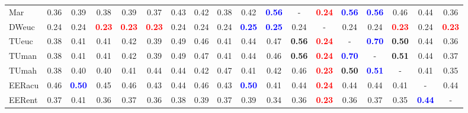 \begin{table}[h]
\begin{center}
{\begin{tabular}{lcc|cc|cc|cc|cc|cc|cc|cc|c}
Mar	&   0.36 &   0.39 &   0.38 &   0.39 &   0.37 &   0.43 &   0.42 &   0.38 &   0.42 & \textcolor{blue}{\textbf{  0.56}} & - & \textcolor{red}{\textbf{  0.24}} & \textcolor{blue}{\textbf{  0.56}} & \textcolor{blue}{\textbf{  0.56}} &   0.46 &   0.44 &   0.36 \\
DWeuc	&   0.24 &   0.24 & \textcolor{red}{\textbf{  0.23}} & \textcolor{red}{\textbf{  0.23}} & \textcolor{red}{\textbf{  0.23}} &   0.24 &   0.24 &   0.24 & \textcolor{blue}{\textbf{  0.25}} & \textcolor{blue}{\textbf{  0.25}} &   0.24 & - &   0.24 &   0.24 & \textcolor{red}{\textbf{  0.23}} &   0.24 & \textcolor{red}{\textbf{  0.23}} \\ \hline
TUeuc	&   0.38 &   0.41 &   0.41 &   0.42 &   0.39 &   0.49 &   0.46 &   0.41 &   0.44 &   0.47 & \textbf{  0.56} & \textcolor{red}{\textbf{  0.24}} & - & \textcolor{blue}{\textbf{  0.70}} & \textbf{  0.50} &   0.44 &   0.36 \\
TUman	&   0.38 &   0.41 &   0.41 &   0.42 &   0.39 &   0.49 &   0.47 &   0.41 &   0.44 &   0.46 & \textbf{  0.56} & \textcolor{red}{\textbf{  0.24}} & \textcolor{blue}{\textbf{  0.70}} & - & \textbf{  0.51} &   0.44 &   0.37 \\ \hline
TUmah	&   0.38 &   0.40 &   0.40 &   0.41 &   0.44 &   0.44 &   0.42 &   0.47 &   0.41 &   0.42 &   0.46 & \textcolor{red}{\textbf{  0.23}} & \textbf{  0.50} & \textcolor{blue}{\textbf{  0.51}} & - &   0.41 &   0.35 \\
EERacu	&   0.46 & \textcolor{blue}{\textbf{  0.50}} &   0.45 &   0.46 &   0.43 &   0.44 &   0.46 &   0.43 & \textcolor{blue}{\textbf{  0.50}} &   0.41 &   0.44 & \textcolor{red}{\textbf{  0.24}} &   0.44 &   0.44 &   0.41 & - &   0.44 \\ \hline
EERent	&   0.37 &   0.41 &   0.36 &   0.37 &   0.36 &   0.38 &   0.39 &   0.37 &   0.39 &   0.34 &   0.36 & \textcolor{red}{\textbf{  0.23}} &   0.36 &   0.37 &   0.35 & \textcolor{blue}{\textbf{  0.44}} & - \\\end{tabular}}\label{stratDists}
\end{center}
\end{table}